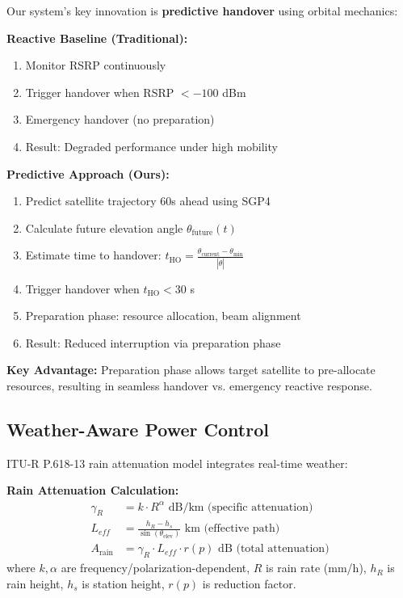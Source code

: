 \documentclass[conference]{IEEEtran}
\begin{document}
Our system's key innovation is \textbf{predictive handover} using orbital mechanics:

\textbf{Reactive Baseline (Traditional):}
\begin{enumerate}
    \item Monitor RSRP continuously
    \item Trigger handover when RSRP $< -100$ dBm
    \item Emergency handover (no preparation)
    \item Result: Degraded performance under high mobility
\end{enumerate}

\textbf{Predictive Approach (Ours):}
\begin{enumerate}
    \item Predict satellite trajectory 60s ahead using SGP4
    \item Calculate future elevation angle $\theta_{\text{future}}(t)$
    \item Estimate time to handover: $t_{\text{HO}} = \frac{\theta_{\text{current}} - \theta_{\text{min}}}{|\dot{\theta}|}$
    \item Trigger handover when $t_{\text{HO}} < 30$ s
    \item Preparation phase: resource allocation, beam alignment
    \item Result: Reduced interruption via preparation phase
\end{enumerate}

\textbf{Key Advantage:} Preparation phase allows target satellite to pre-allocate resources, resulting in seamless handover vs. emergency reactive response.

\subsection{Weather-Aware Power Control}

ITU-R P.618-13 \cite{itur_p618} rain attenuation model integrates real-time weather:

\textbf{Rain Attenuation Calculation:}
\begin{align}
\gamma_R &= k \cdot R^{\alpha} \text{ dB/km (specific attenuation)} \\
L_{eff} &= \frac{h_R - h_s}{\sin(\theta_{\text{elev}})} \text{ km (effective path)} \\
A_{\text{rain}} &= \gamma_R \cdot L_{eff} \cdot r(p) \text{ dB (total attenuation)}
\end{align}
where $k, \alpha$ are frequency/polarization-dependent, $R$ is rain rate (mm/h), $h_R$ is rain height, $h_s$ is station height, $r(p)$ is reduction factor.
\end{document}
